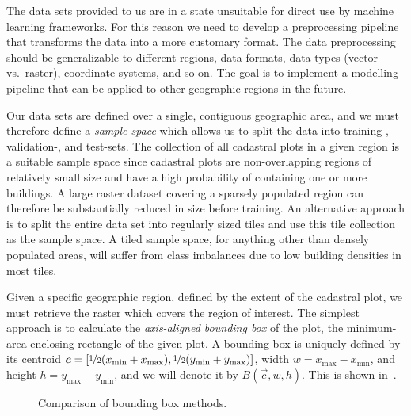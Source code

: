The data sets provided to us are in a state unsuitable for direct use by machine learning frameworks.
For this reason we need to develop a preprocessing pipeline that transforms the data into a more customary format.
The data preprocessing should be generalizable to different regions, data formats, data types (vector vs.\ raster), coordinate systems, and so on.
The goal is to implement a modelling pipeline that can be applied to other geographic regions in the future.

Our data sets are defined over a single, contiguous geographic area, and we must therefore define a \textit{sample space} which allows us to split the data into training-, validation-, and test-sets.
The collection of all cadastral plots in a given region is a suitable sample space since cadastral plots are non-overlapping regions of relatively small size and have a high probability of containing one or more buildings.
A large raster dataset covering a sparsely populated region can therefore be substantially reduced in size before training.
An alternative approach is to split the entire data set into regularly sized tiles and use this tile collection as the sample space.
A tiled sample space, for anything other than densely populated areas, will suffer from class imbalances due to low building densities in most tiles.

Given a specific geographic region, defined by the extent of the cadastral plot, we must retrieve the raster which covers the region of interest.
The simplest approach is to calculate the \textit{axis-aligned bounding box} of the plot, the minimum-area enclosing rectangle of the given plot.
A bounding box is uniquely defined by its centroid $\vec{c} = [\nicefrac{1}{2}(x_{\mathrm{\min}} + x_{\mathrm{\max}}), \nicefrac{1}{2}(y_{\mathrm{\min}} + y_{\mathrm{\max}})]$, width $w = x_{\mathrm{\max}} - x_{\mathrm{\min}}$, and height $h = y_{\mathrm{\max}} - y_{\mathrm{\min}}$, and we will denote it by $B(\vec{c}, w, h)$.
This is shown in~.

\begin{figure}[htb]
  \captionsetup[subfigure]{position=b}
  \centering
  \hspace{2em}
  \caption{Comparison of bounding box methods.}
\end{figure}

